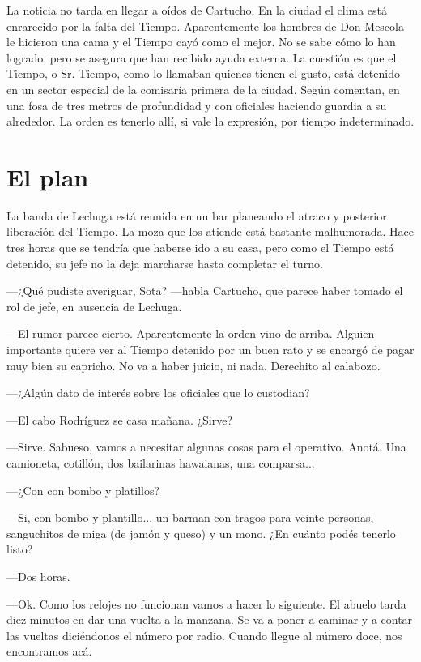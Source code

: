 La noticia no tarda en llegar a oídos de Cartucho. En la ciudad el clima está enrarecido por la falta del Tiempo. Aparentemente los hombres de Don Mescola le hicieron una cama y el Tiempo cayó como el mejor. No se sabe cómo lo han logrado, pero se asegura que han recibido ayuda externa. La cuestión es que el Tiempo, o Sr. Tiempo, como lo llamaban quienes tienen el gusto, está detenido en un sector especial de la comisaría primera de la ciudad. Según comentan, en una fosa de tres metros de profundidad y con oficiales haciendo guardia a su alrededor. La orden es tenerlo allí, si vale la expresión, por tiempo indeterminado.

\chapter*{El plan}

La banda de Lechuga está reunida en un bar planeando el atraco y posterior liberación del Tiempo. La moza que los atiende está bastante malhumorada. Hace tres horas que se tendría que haberse ido a su casa, pero como el Tiempo está detenido, su jefe no la deja marcharse hasta completar el turno.

---¿Qué pudiste averiguar, Sota? ---habla Cartucho, que parece haber tomado el rol de jefe, en ausencia de Lechuga.

---El rumor parece cierto. Aparentemente la orden vino de arriba. Alguien importante quiere ver al Tiempo detenido por un buen rato y se encargó de pagar muy bien su capricho. No va a haber juicio, ni nada. Derechito al calabozo.

---¿Algún dato de interés sobre los oficiales que lo custodian?

---El cabo Rodríguez se casa mañana. ¿Sirve?

---Sirve. Sabueso, vamos a necesitar algunas cosas para el operativo. Anotá. Una camioneta, cotillón, dos bailarinas hawaianas, una comparsa...

---¿Con con bombo y platillos?

---Si, con bombo y plantillo... un barman con tragos para veinte personas,  sanguchitos de miga (de jamón y queso) y un mono. ¿En cuánto podés tenerlo listo?

---Dos horas.

---Ok. Como los relojes no funcionan vamos a hacer lo siguiente. El abuelo tarda diez  minutos en dar una vuelta a la manzana. Se va a poner a caminar y a contar las vueltas diciéndonos el número por radio. Cuando llegue al número doce, nos encontramos acá.

